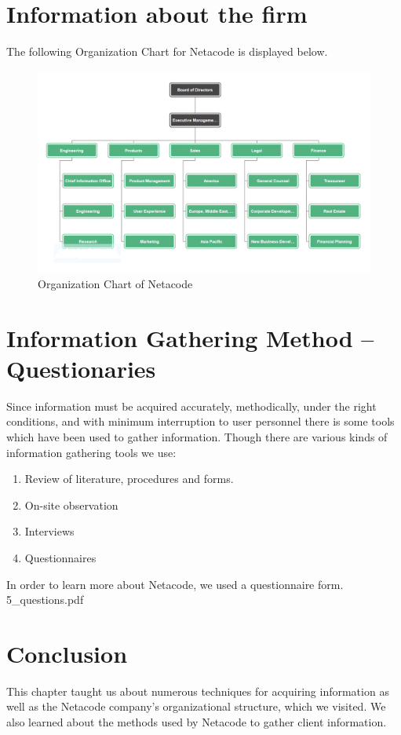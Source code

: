 \documentclass[a4paper,12pt]{report}
\begin{document}
\section{Information about the firm}
The following Organization Chart for Netacode is displayed below.
\newpage
\begin{figure}[h]
	\centering
	\includegraphics[width=0.9\linewidth]{5_2}
	\caption{Organization Chart of Netacode}
	\label{fig:52}
\end{figure}

\section{Information Gathering Method – Questionaries}
Since information must be acquired accurately, methodically, under the right conditions, and
with minimum interruption to user personnel there is some tools which have been used to gather
information. Though there are various kinds of information gathering tools we use:\\
\begin{enumerate}
	\item  Review of literature, procedures and forms.
	\item  On-site observation
	\item  Interviews
	\item Questionnaires
\end{enumerate}
In order to learn more about Netacode, we used a questionnaire form.
	 {5_questions.pdf}
\section{Conclusion}
This chapter taught us about numerous techniques for acquiring information as well as the Netacode company's organizational structure, which we visited. We also learned about the methods used by Netacode to gather client information.
\end{document}
